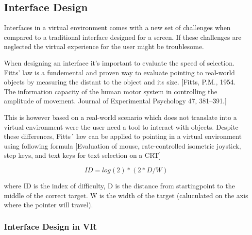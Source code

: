\subsection{Interface Design}
Interfaces in a virtual environment comes with a new set of challenges when compared to a traditional interface designed for a screen. If these challenges are neglected the virtual experience for the user might be troublesome.

When designing an interface it's important to evaluate the speed of selection. Fitts' law is a fundemental and proven way to evaluate pointing to real-world objects by measuring the distant to the object and its size. [Fitts, P.M., 1954. The information capacity of the human motor system in controlling the amplitude of
movement. Journal of Experimental Psychology 47, 381–391.]

This is however based on a real-world scenario which does not translate into a virtual environment were the user need a tool to interact with objects. Despite these differences, Fitts´ law can be applied to pointing in a virtual environment using following formula  [Evaluation of mouse, rate-controlled isometric joystick, step keys,
and text keys for text selection on a CRT]

\begin{equation}
ID = log(2) * ( 2* D / W )
\end{equation}

where ID is the index of difficulty, D is the distance from startingpoint to the middle of the correct target. W is the width of the target (caluculated  on the axis where the pointer will travel).

\subsubsection {Interface Design in VR}
